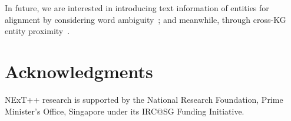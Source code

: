 \documentclass[11pt,a4paper]{article}
\begin{document}
In future, we are interested in introducing text information of entities for alignment by considering word ambiguity~\cite{cao2017modeling}; and meanwhile, through cross-KG entity proximity~\cite{cao2015name}.

\section*{Acknowledgments}

NExT++ research is supported by the National Research Foundation, Prime Minister's Office, Singapore under its IRC@SG Funding Initiative.



\end{document}

